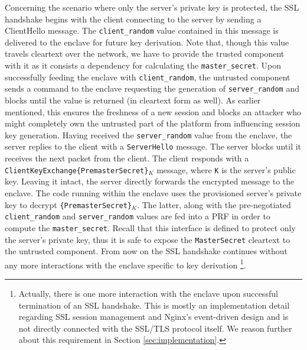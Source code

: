 \documentclass[../../main.tex]{subfiles}
\begin{document}
Concerning the scenario where only the server's private key is
protected, the SSL handshake begins with the client connecting to the
server by sending a ClientHello message. The \texttt{client\_random}
value contained in this message is delivered to the enclave for future
key derivation. Note that, though this value travels cleartext over
the network, we have to provide the trusted component with it as it
consists a dependency for calculating the
\texttt{master\_secret}. Upon successfully feeding the enclave with
\texttt{client\_random}, the untrusted component sends a command to
the enclave requesting the generation of \texttt{server\_random} and
blocks until the value is returned (in cleartext form as well). As
earlier mentioned, this ensures the freshness of a new session and
blocks an attacker who might completely own the untrusted part of the
platform from influencing session key generation. Having received the
\texttt{server\_random} value from the enclave, the server replies to
the client with a \texttt{ServerHello} message. The server blocks
until it receives the next packet from the client. The client responds
with a \texttt{ClientKeyExchange\{PremasterSecret\}$_K$} message,
where \texttt{K} is the server's public key. Leaving it intact, the
server directly forwards the encrypted message to the enclave. The
code running within the enclave uses the provisioned server's private
key to decrypt \texttt{\{PremasterSecret\}$_K$}.  The latter, along
with the pre-negotiated \texttt{client\_random} and
\texttt{server\_random} values are fed into a PRF in order to compute
the \texttt{master\_secret}. Recall that this interface is defined to
protect only the server's private key, thus it is safe to expose the
\texttt{MasterSecret} cleartext to the untrusted component. From now
on the SSL handshake continues without any more interactions with the
enclave specific to key derivation \footnote{Actually, there is one
more interaction with the enclave upon successful termination of an
SSL handshake. This is mostly an implementation detail regarding SSL
session management and Nginx's event-driven design and is not directly
connected with the SSL/TLS protocol itself. We reason further about
this requirement in Section \ref{sec:implementation}.}.
\end{document}
